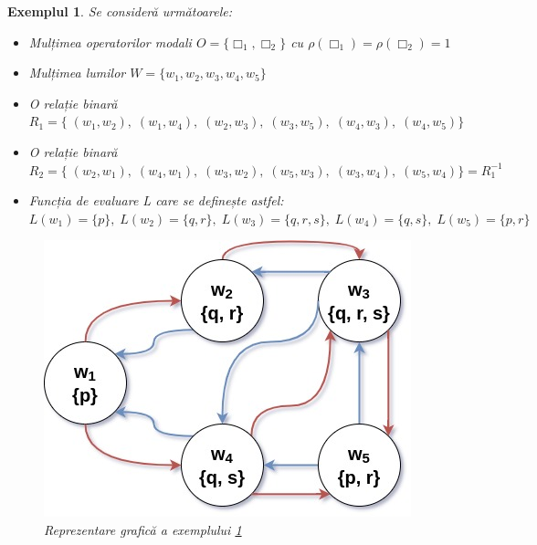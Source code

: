 \documentclass[12pt, openany]{book}
\newtheorem{example}[definition]{Exemplul} %
\begin{document}
            \begin{example}
            \label{ex_modal_logic}
                Se consideră următoarele:
                \begin{itemize}
                    \item Mulțimea operatorilor modali $O=\{\Box_1, \Box_2\}$ cu $\rho(\Box_1)=\rho(\Box_2)=1$
                    \item Mulțimea lumilor $W=\{w_1,w_2,w_3,w_4,w_5\}$
                    \item O relație binară $R_1=\{\;(w_1,w_2),\;(w_1,w_4),\;(w_2,w_3),\;(w_3,w_5),\;(w_4,w_3),\;(w_4,w_5)\}$
                    \item O relație binară $R_2=\{\;(w_2,w_1),\;(w_4,w_1),\;(w_3,w_2),\;(w_5,w_3),\;(w_3,w_4),\;(w_5,w_4)\}=R_1^{-1}$
                    \item Funcția de evaluare L care se definește astfel: $L(w_1)=\{p\},\; L(w_2)=\{q,r\},\; L(w_3)=\{q,r,s\},\; 
                    L(w_4)=\{q,s\},\;L(w_5)=\{p,r\}$
                \end{itemize}

                \begin{figure}[h!]
                \label{fig_example_4}
                    \includegraphics[width=0.5\linewidth]{images/example_3.jpg}
                    \centering
                    \caption{Reprezentare grafică a exemplului \ref{ex_modal_logic}}
                \end{figure}


\end{example}
\end{document}
